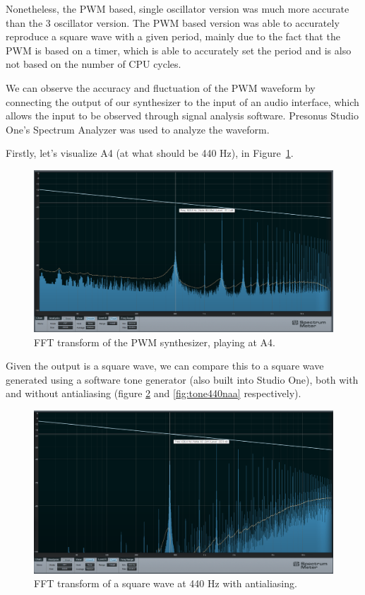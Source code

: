 \documentclass[12pt]{article}
\begin{document}
Nonetheless, the PWM based, single oscillator version was much more accurate than the 3 oscillator version.
The PWM based version was able to accurately reproduce a square wave with a given period, mainly due to the fact that the PWM is based on a timer, which is able to accurately set the period and is also not based on the number of CPU cycles.

We can observe the accuracy and fluctuation of the PWM waveform by connecting the output of our synthesizer to the input of an audio interface, which allows the input to be observed through signal analysis software. Presonus Studio One's Spectrum Analyzer was used to analyze the waveform. 

Firstly, let's visualize A4 (at what should be 440 Hz), in Figure~\ref{fig:pwm440}. 

\begin{figure}
    \centering
    \includegraphics[width = \textwidth]{FFTA4V2.png}
    \caption{FFT transform of the PWM synthesizer, playing at A4. }
    \label{fig:pwm440}
\end{figure}

Given the output is a square wave, we can compare this to a square wave generated using a software tone generator (also built into Studio One), both with and without antialiasing (figure \ref{fig:tone440aa} and \ref{fig:tone440naa} respectively). 

\begin{figure}
    \centering
    \includegraphics[width = \textwidth]{FFT440AA.png}
    \caption{FFT transform of a square wave at 440 Hz with antialiasing. }
    \label{fig:tone440aa}
\end{figure}
\end{document}
